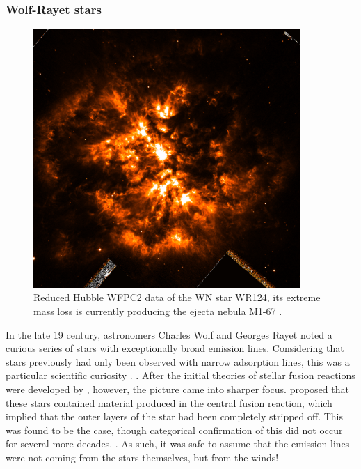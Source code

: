\subsubsection{Wolf-Rayet stars}
\label{sec:wrtype}

\begin{figure}[ht]
  \centering
  \includegraphics[width=4in]{assets/WR124.png}
  \caption[\textit{M1-67 nebula around WR124 \parencite{2010ApJ...724L..90M}}]{Reduced Hubble WFPC2 data of the WN star WR124, its extreme mass loss is currently producing the ejecta nebula M1-67 \parencite{2010ApJ...724L..90M}.}
  \label{fig:wr124}
\end{figure}


\noindent
In the late 19 century, astronomers Charles Wolf and Georges Rayet noted a curious series of stars with exceptionally broad emission lines.
Considering that stars previously had only been observed with narrow adsorption lines, this was a particular scientific curiosity
\parencite{crowther_physical_2007}.
.
After the initial theories of stellar fusion reactions were developed by \textcite{betheEnergyProductionStars1939}, however, the picture came into sharper focus.
\textcite{gamowWCWNStars1943} proposed that these stars contained material produced in the central fusion reaction, which implied that the outer layers of the star had been completely stripped off.
This was found to be the case, though categorical confirmation of this did not occur for several more decades.
.
As such, it was safe to assume that the emission lines were not coming from the stars themselves, but from the winds!

